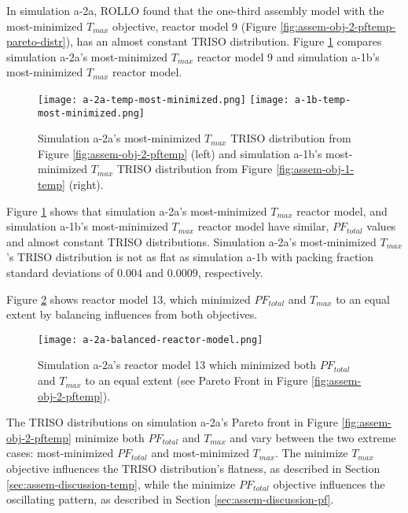 In simulation a-2a, \gls{ROLLO} found that the one-third assembly model with the 
most-minimized $T_{max}$ objective, reactor model 9 (Figure 
\ref{fig:assem-obj-2-pftemp-pareto-distr}), has an almost constant TRISO distribution.
Figure \ref{fig:a-2a-temp-triso-comparison} compares simulation a-2a's most-minimized 
$T_{max}$ reactor model 9 and simulation a-1b's most-minimized $T_{max}$ reactor model. 
\begin{figure}[htbp!]
    \centering
    \texttt{[image: a-2a-temp-most-minimized.png]} 
    \texttt{[image: a-1b-temp-most-minimized.png]} 
    \caption{Simulation a-2a's most-minimized $T_{max}$ TRISO distribution 
    from Figure \ref{fig:assem-obj-2-pftemp} (left) and simulation a-1b's 
    most-minimized $T_{max}$ TRISO distribution from Figure 
    \ref{fig:assem-obj-1-temp} (right).}
    \label{fig:a-2a-temp-triso-comparison}
\end{figure}
Figure \ref{fig:a-2a-temp-triso-comparison} shows that simulation a-2a's most-minimized 
$T_{max}$ reactor model, and simulation a-1b's most-minimized $T_{max}$ reactor model 
have similar, $PF_{total}$ values and almost constant TRISO distributions.
Simulation a-2a's most-minimized $T_{max}$'s TRISO distribution is not as flat 
as simulation a-1b with packing fraction standard deviations of $0.004$ and $0.0009$, 
respectively.

Figure \ref{fig:a-2a-balanced-reactor-model} shows reactor model 13, which 
minimized $PF_{total}$ and $T_{max}$ to an equal extent by balancing influences 
from both objectives. 
\begin{figure}[htbp!]
    \centering
    \texttt{[image: a-2a-balanced-reactor-model.png]} 
    \caption{Simulation a-2a's reactor model 13 which minimized both $PF_{total}$ and $T_{max}$ 
    to an equal extent (see Pareto Front in Figure \ref{fig:assem-obj-2-pftemp}).}
    \label{fig:a-2a-balanced-reactor-model}
\end{figure}
The \gls{TRISO} distributions on simulation a-2a's Pareto front in Figure 
\ref{fig:assem-obj-2-pftemp} minimize both $PF_{total}$ and $T_{max}$ and vary
between the two extreme cases: most-minimized $PF_{total}$ and most-minimized $T_{max}$. 
The minimize $T_{max}$ objective influences the TRISO distribution's flatness, as 
described in Section \ref{sec:assem-discussion-temp}, while 
the minimize $PF_{total}$ objective influences the oscillating pattern, as described 
in Section \ref{sec:assem-discussion-pf}.

